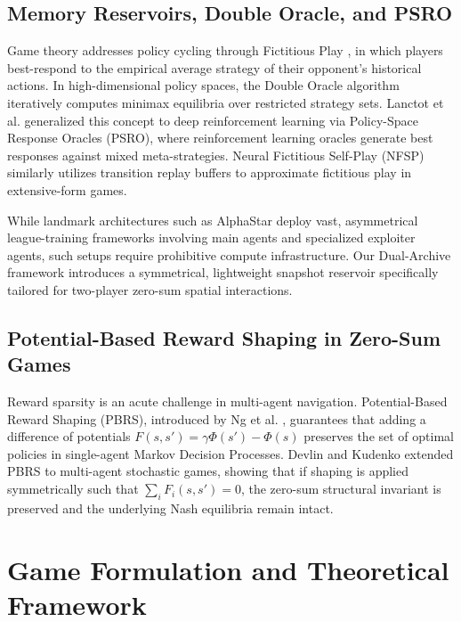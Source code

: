\documentclass[conference]{IEEEtran}
\begin{document}
\subsection{Memory Reservoirs, Double Oracle, and PSRO}
Game theory addresses policy cycling through Fictitious Play \cite{brown1951iterative}, in which players best-respond to the empirical average strategy of their opponent's historical actions. In high-dimensional policy spaces, the Double Oracle algorithm \cite{mcmahan2003planning} iteratively computes minimax equilibria over restricted strategy sets. Lanctot et al. \cite{lanctot2017unified} generalized this concept to deep reinforcement learning via Policy-Space Response Oracles (PSRO), where reinforcement learning oracles generate best responses against mixed meta-strategies. Neural Fictitious Self-Play (NFSP) \cite{heinrich2016deep} similarly utilizes transition replay buffers to approximate fictitious play in extensive-form games. 

While landmark architectures such as AlphaStar \cite{vinyals2019alphastar} deploy vast, asymmetrical league-training frameworks involving main agents and specialized exploiter agents, such setups require prohibitive compute infrastructure. Our Dual-Archive framework introduces a symmetrical, lightweight snapshot reservoir specifically tailored for two-player zero-sum spatial interactions.

\subsection{Potential-Based Reward Shaping in Zero-Sum Games}
Reward sparsity is an acute challenge in multi-agent navigation. Potential-Based Reward Shaping (PBRS), introduced by Ng et al. \cite{ng1999policy}, guarantees that adding a difference of potentials $F(s, s') = \gamma \Phi(s') - \Phi(s)$ preserves the set of optimal policies in single-agent Markov Decision Processes. Devlin and Kudenko \cite{devlin2011theoretical} extended PBRS to multi-agent stochastic games, showing that if shaping is applied symmetrically such that $\sum_{i} F_i(s, s') = 0$, the zero-sum structural invariant is preserved and the underlying Nash equilibria remain intact.

\section{Game Formulation and Theoretical Framework}
\end{document}

